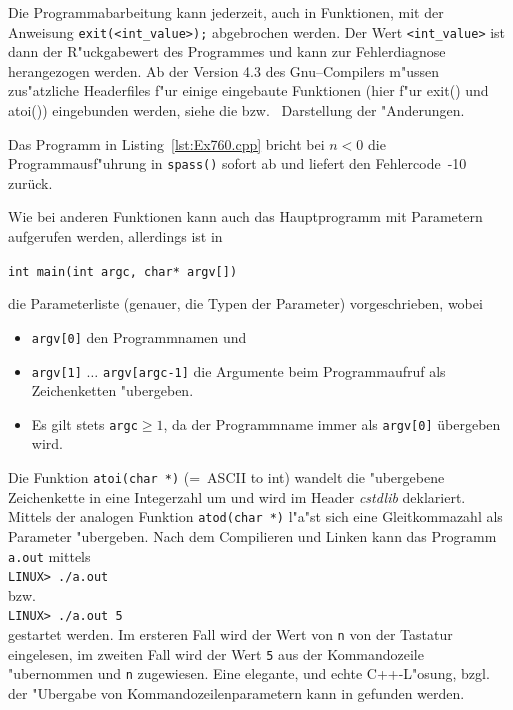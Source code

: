 Die Programmabarbeitung kann jederzeit, auch in Funktionen, mit der
Anweisung \verb|exit(<int_value>);| abgebrochen werden.
Der Wert \verb|<int_value>| ist dann der  R"uckgabewert des Programmes
und
kann zur Fehlerdiagnose herangezogen werden.
Ab der Version 4.3 des Gnu--Compilers m"ussen zus"atzliche Headerfiles f"ur
einige eingebaute Funktionen (hier f"ur \textrm{exit()} und \textrm{atoi()})
eingebunden werden, siehe die
bzw.\   
Darstellung der "Anderungen.

Das Programm in Listing~\ref{lst:Ex760.cpp} bricht bei $n < 0$ die Programmausf"uhrung
in \verb|spass()| sofort ab und liefert den Fehlercode~-10 zurück.
%

Wie bei anderen Funktionen kann auch das Hauptprogramm mit Parametern
aufgerufen werden, allerdings ist in

\centerline{\texttt{int main(int argc, char* argv[])}}

die Parameterliste (genauer, die Typen der Parameter) vorgeschrieben, wobei
\begin{itemize}
 \item \verb|argv[0]| den Programmnamen und
 \item \verb|argv[1]| $\ldots$ \verb|argv[argc-1]| die Argumente
 	beim Programmaufruf als Zeichenketten "ubergeben.
 \item Es gilt stets \verb|argc|$\ge 1$, da der Programmname
 	immer als \verb|argv[0]| übergeben wird.
\end{itemize}
%
%

Die Funktion \verb|atoi(char *)| (=~ASCII to int)
wandelt die "ubergebene Zeichenkette in
eine Integerzahl um und wird im Header \textit{cstdlib} deklariert.
Mittels der analogen Funktion \verb|atod(char *)| l"a"st sich eine
Gleitkommazahl als Parameter "ubergeben.
Nach dem Compilieren und Linken kann das Programm \verb|a.out|
mittels
\\[0.5ex] \verb|LINUX> ./a.out| \\[0.5ex] bzw.\\[0.5ex] \verb|LINUX> ./a.out 5| \\[0.5ex]
gestartet werden. Im ersteren Fall wird der Wert von \verb|n| von
der Tastatur eingelesen, im zweiten Fall wird der Wert \verb|5|
aus der Kommandozeile "ubernommen und \verb|n| zugewiesen.
Eine elegante, und echte C++-L"osung, bzgl. der "Ubergabe von
Kommandozeilenparametern kann in \cite[pp.126]{Stroustrup:2000:CPP}
gefunden werden.
%
%
